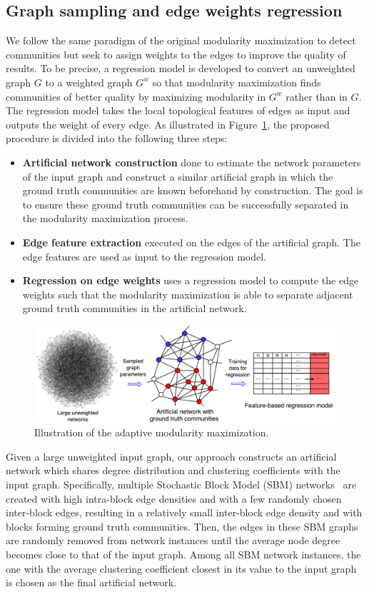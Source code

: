 \subsection{Graph sampling and edge weights regression}
We follow the same paradigm of the original modularity maximization to detect communities but seek to assign weights to the edges to improve the quality of results. To be precise, a regression model is developed to convert an unweighted graph $G$ to a weighted graph $G^{w}$ so that modularity maximization finds communities of better quality by maximizing modularity in $G^{w}$ rather than in $G$. The regression model takes the local topological features of edges as input and outputs the weight of every edge. As illustrated in Figure~\ref{fig:illustration}, the proposed procedure is divided into the following three steps:
\begin{itemize}
    \item {\bf Artificial network construction} done to estimate the network parameters of the input graph and construct a similar artificial graph in which the ground truth communities are known beforehand by construction. The goal is to ensure these ground truth communities can be successfully separated in the modularity maximization process.
    \item {\bf Edge feature extraction} executed on the edges of the artificial graph. The edge features are used as input to the regression model.
    \item {\bf Regression on edge weights} uses a regression model to compute the edge weights such that the modularity maximization is able to separate adjacent ground truth communities in the artificial network.
\end{itemize}
\begin{figure}
    \centering    
    \includegraphics[width=\textwidth]{img/chap2/illustration2.pdf}
    \caption{Illustration of the adaptive modularity maximization.}
    \label{fig:illustration}
\end{figure}
Given a large unweighted input graph, our approach constructs an artificial network which shares degree distribution and clustering coefficients with the input graph. Specifically, multiple Stochastic Block Model (SBM) networks~\cite{holland1983stochastic} are created with high intra-block edge densities and with a few randomly chosen inter-block edges, resulting in a relatively small inter-block edge density and with blocks forming ground truth communities. Then, the edges in these SBM graphs are randomly removed from network instances until the average node degree becomes close to that of the input graph. Among all SBM network instances, the one with the average clustering coefficient closest in its value to the input graph is chosen as the final artificial network.
